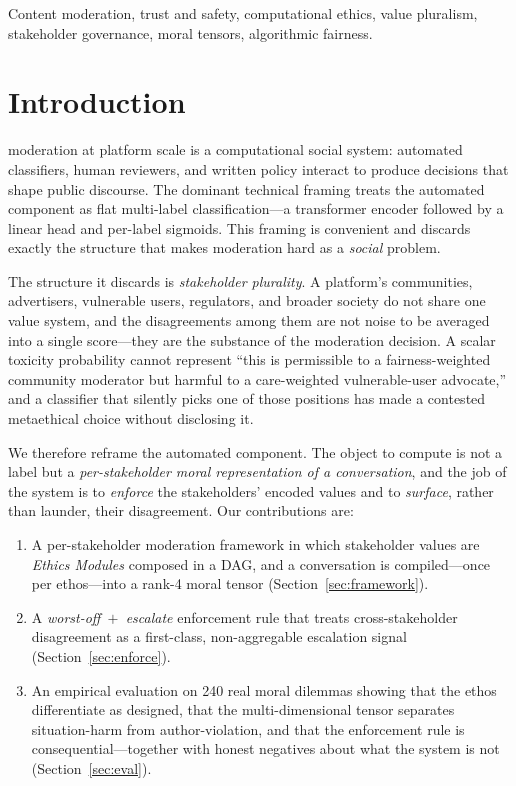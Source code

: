 \documentclass[journal]{IEEEtran}
\begin{document}
\begin{IEEEkeywords}
Content moderation, trust and safety, computational ethics, value pluralism,
stakeholder governance, moral tensors, algorithmic fairness.
\end{IEEEkeywords}

\section{Introduction}
 moderation at platform scale is a computational social
system: automated classifiers, human reviewers, and written policy interact to
produce decisions that shape public discourse. The dominant technical framing
treats the automated component as flat multi-label classification---a
transformer encoder followed by a linear head and per-label sigmoids. This
framing is convenient and discards exactly the structure that makes moderation
hard as a \emph{social} problem.

The structure it discards is \emph{stakeholder plurality}. A platform's
communities, advertisers, vulnerable users, regulators, and broader society do
not share one value system, and the disagreements among them are not noise to be
averaged into a single score---they are the substance of the moderation
decision. A scalar toxicity probability cannot represent ``this is permissible
to a fairness-weighted community moderator but harmful to a care-weighted
vulnerable-user advocate,'' and a classifier that silently picks one of those
positions has made a contested metaethical choice without disclosing it.

We therefore reframe the automated component. The object to compute is not a
label but a \emph{per-stakeholder moral representation of a conversation}, and
the job of the system is to \emph{enforce} the stakeholders' encoded values and
to \emph{surface}, rather than launder, their disagreement. Our contributions
are:
\begin{enumerate}
\item A per-stakeholder moderation framework in which stakeholder values are
\emph{Ethics Modules} composed in a DAG, and a conversation is compiled---once
per ethos---into a rank-4 moral tensor (Section~\ref{sec:framework}).
\item A \emph{worst-off~$+$~escalate} enforcement rule that treats
cross-stakeholder disagreement as a first-class, non-aggregable escalation
signal (Section~\ref{sec:enforce}).
\item An empirical evaluation on 240 real moral dilemmas showing that the ethos
differentiate as designed, that the multi-dimensional tensor separates
situation-harm from author-violation, and that the enforcement rule is
consequential---together with honest negatives about what the system is not
(Section~\ref{sec:eval}).
\end{enumerate}
\end{document}
